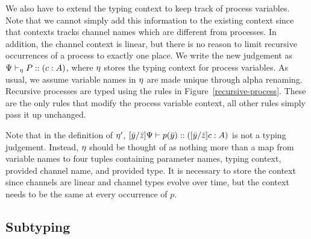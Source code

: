 \documentclass[a4paper,USenglish]{lipics-v2016}
\begin{document}
We also have to extend the typing context to keep track of process variables. Note that we cannot simply add this information to the existing context since that contexts tracks channel names which are different from processes. In addition, the channel context is linear, but there is no reason to limit recursive occurrences of a process to exactly one place. We write the new judgement as ${\Psi} \vdash_{\eta} P :: (c : A)$, where $\eta$ stores the typing context for process variables. As usual, we assume variable names in $\eta$ are made unique through alpha renaming. Recursive processes are typed using the rules in Figure~\ref{recursive-process}. These are the only rules that modify the process variable context, all other rules simply pass it up unchanged.


Note that in the definition of $\eta'$, $\lbrack{\bar{y}}/{\bar{z}}\rbrack{\Psi} \vdash {p}(\bar{y}) :: (\lbrack{\bar{y}}/{\bar{z}}\rbrack{c} : A)$ is not a typing judgement. Instead, $\eta$ should be thought of as nothing more than a map from variable names to four tuples containing parameter names, typing context, provided channel name, and provided type. It is necessary to store the context since channels are linear and channel types evolve over time, but the context needs to be the same at every occurrence of $p$.


\subsection{Subtyping}
\end{document}
